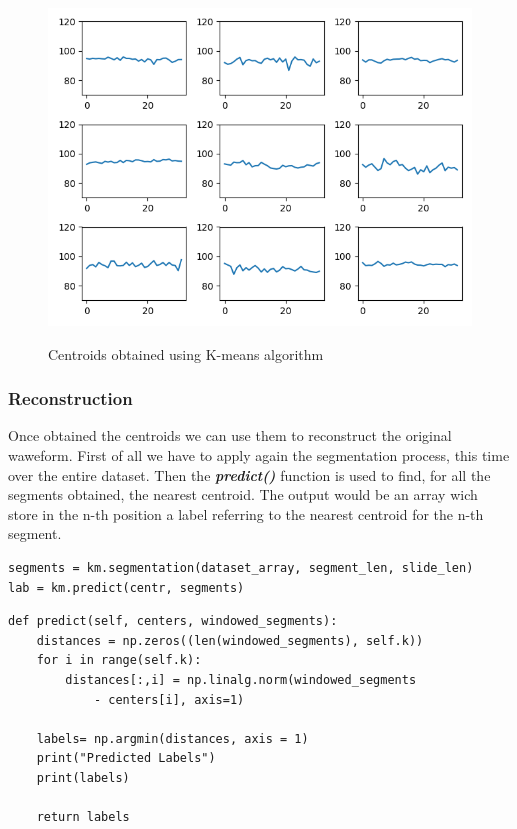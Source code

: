 \documentclass[12pt]{article}
\begin{document}
			\begin{figure}[h!]
				\centering
				\includegraphics[scale=0.60]{img/centroids.png}
				\label{fig6}
				\caption{Centroids obtained using K-means algorithm}
			\end{figure}
		
		\subsubsection{Reconstruction}
		
			Once obtained the centroids we can use them to reconstruct the original waweform. First of all we have to apply again the segmentation process, this time over the entire dataset. Then the \textbf{\textit{predict()}} function is used to find, for all the segments obtained, the nearest centroid. The output would be an array wich store in the n-th position a label referring to the nearest centroid for the n-th segment.
		
			\begin{lstlisting}
segments = km.segmentation(dataset_array, segment_len, slide_len)
lab = km.predict(centr, segments)
			\end{lstlisting}  
			
			\begin{lstlisting}
def predict(self, centers, windowed_segments):
	distances = np.zeros((len(windowed_segments), self.k))
	for i in range(self.k):
		distances[:,i] = np.linalg.norm(windowed_segments 
			- centers[i], axis=1)
		
	labels= np.argmin(distances, axis = 1)
	print("Predicted Labels")
	print(labels)
				
	return labels
			\end{lstlisting}
		
\end{document}
